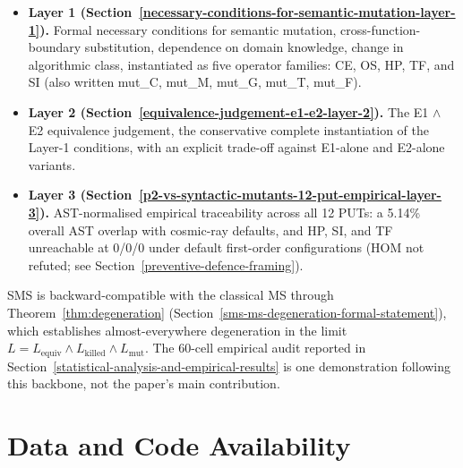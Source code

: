 \documentclass[manuscript,screen,review]{acmart}
\begin{document}
\begin{itemize}

\item
  \textbf{Layer 1 (Section~\ref{necessary-conditions-for-semantic-mutation-layer-1}).} Formal necessary conditions for semantic
  mutation, cross-function-boundary substitution, dependence on domain
  knowledge, change in algorithmic class, instantiated as five
  operator families: CE, OS, HP, TF, and SI (also written mut\_C,
  mut\_M, mut\_G, mut\_T, mut\_F).
\item
  \textbf{Layer 2 (Section~\ref{equivalence-judgement-e1-e2-layer-2}).} The E1 $\wedge$ E2 equivalence judgement, the
  conservative complete instantiation of the Layer-1 conditions, with an
  explicit trade-off against E1-alone and E2-alone variants.
\item
  \textbf{Layer 3 (Section~\ref{p2-vs-syntactic-mutants-12-put-empirical-layer-3}).} AST-normalised empirical traceability across
  all 12 PUTs: a 5.14\% overall AST overlap with cosmic-ray defaults,
  and HP, SI, and TF unreachable at 0/0/0 under default first-order
  configurations (HOM not refuted; see Section~\ref{preventive-defence-framing}).
\end{itemize}

SMS is backward-compatible with the classical MS through
Theorem~\ref{thm:degeneration} (Section~\ref{sms-ms-degeneration-formal-statement}), which establishes almost-everywhere degeneration in the limit
$L = L_{\mathrm{equiv}} \wedge L_{\mathrm{killed}} \wedge L_{\mathrm{mut}}$. The 60-cell empirical
audit reported in Section~\ref{statistical-analysis-and-empirical-results} is one demonstration following this backbone, not
the paper's main contribution.

\section*{Data and Code Availability}\label{data-and-code-availability}
\end{document}
